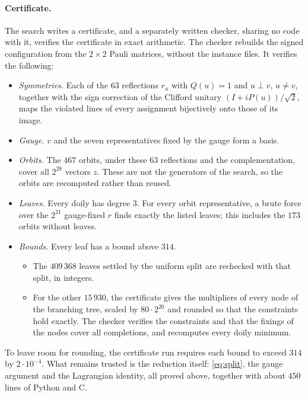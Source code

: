 \documentclass[11pt]{article}
\theoremstyle{definition}
\theoremstyle{remark}
\begin{document}
\paragraph{Certificate.}\label{sec:ellcert}
The search writes a certificate, and a separately written checker, sharing no code with it, verifies the certificate in exact arithmetic.
The checker rebuilds the signed configuration from the $2\times2$ Pauli matrices, without the instance files.
It verifies the following:
\begin{itemize}[leftmargin=*]
\item \emph{Symmetries.} Each of the $63$ reflections $r_u$ with $Q(u)=1$ and $u\perp v$, $u\ne v$, together with the sign correction of the Clifford unitary $(I+iP(u))/\sqrt2$, maps the violated lines of every assignment bijectively onto those of its image.
\item \emph{Gauge.} $v$ and the seven representatives fixed by the gauge form a basis.
\item \emph{Orbits.} The $467$ orbits, under these $63$ reflections and the complementation, cover all $2^{28}$ vectors $z$. These are not the generators of the search, so the orbits are recomputed rather than reused.
\item \emph{Leaves.} Every doily has degree $3$. For every orbit representative, a brute force over the $2^{21}$ gauge-fixed $r$ finds exactly the listed leaves; this includes the $173$ orbits without leaves.
\item \emph{Bounds.} Every leaf has a bound above $314$.
  \begin{itemize}
  \item The $409\,368$ leaves settled by the uniform split are rechecked with that split, in integers.
  \item For the other $15\,930$, the certificate gives the multipliers of every node of the branching tree, scaled by $80\cdot2^{20}$ and rounded so that the constraints hold exactly. The checker verifies the constraints and that the fixings of the nodes cover all completions, and recomputes every doily minimum.
  \end{itemize}
\end{itemize}
To leave room for rounding, the certificate run requires each bound to exceed $314$ by $2\cdot10^{-4}$.
What remains trusted is the reduction itself: \eqref{eq:split}, the gauge argument and the Lagrangian identity, all proved above, together with about $450$ lines of Python and C.
\end{document}

